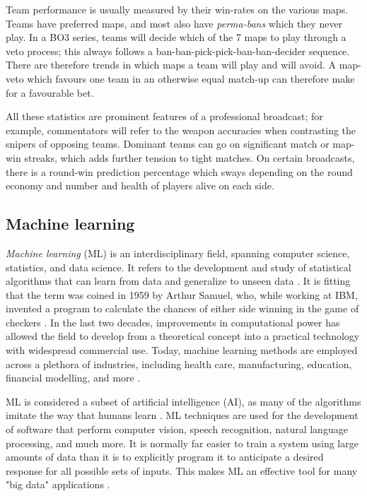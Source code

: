 Team performance is usually measured by their win-rates on the various maps. Teams have preferred maps, and most also have \textit{perma-bans} which they never play. In a BO3 series, teams will decide which of the 7 maps to play through a veto process; this always follows a ban-ban-pick-pick-ban-ban-decider sequence. There are therefore trends in which maps a team will play and will avoid. A map-veto which favours one team in an otherwise equal match-up can therefore make for a favourable bet. \label{vetoprocess}

All these statistics are prominent features of a professional broadcast; for example, commentators will refer to the weapon accuracies when contrasting the snipers of opposing teams. Dominant teams can go on significant match or map-win streaks, which adds further tension to tight matches. On certain broadcasts, there is a round-win prediction percentage which sways depending on the round economy and number and health of players alive on each side.


\subsection{Machine learning}

\textit{Machine learning} (ML) is an interdisciplinary field, spanning computer science, statistics, and data science. It refers to the development and study of statistical algorithms that can learn from data and generalize to unseen data \cite{mlbook}. It is fitting that the term was coined in 1959 by Arthur Samuel, who, while working at IBM, invented a program to calculate the chances of either side winning in the game of checkers \cite{mlcheckers}. In the last two decades, improvements in computational power has allowed the field to develop from a theoretical concept into a practical technology with widespread commercial use. Today, machine learning methods are employed across a plethora of industries, including health care, manufacturing, education, financial modelling, and more \cite{mltrends}.

ML is considered a subset of artificial intelligence (AI), as many of the algorithms imitate the way that humans learn \cite{mlibmdef}. ML techniques are used for the development of software that perform computer vision, speech recognition, natural language processing, and much more. It is normally far easier to train a system using large amounts of data than it is to explicitly program it to anticipate a desired response for all possible sets of inputs. This makes ML an effective tool for many "big data" applications \cite{mltrends}.

